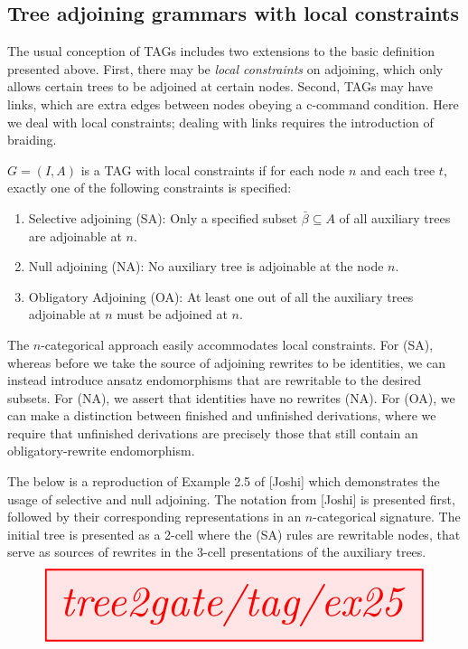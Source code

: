 \subsection{Tree adjoining grammars with local constraints}

The usual conception of TAGs includes two extensions to the basic definition presented above. First, there may be \emph{local constraints} on adjoining, which only allows certain trees to be adjoined at certain nodes. Second, TAGs may have links, which are extra edges between nodes obeying a c-command condition. Here we deal with local constraints; dealing with links requires the introduction of braiding.

\begin{defn}
$G = (I,A)$ is a TAG with local constraints if for each node $n$ and each tree $t$, exactly one of the following constraints is specified:
\begin{enumerate}
\item{Selective adjoining (SA): Only a specified subset $\bar{\beta} \subseteq A$ of all auxiliary trees are adjoinable at $n$.}
\item{Null adjoining (NA): No auxiliary tree is adjoinable at the node $n$.}
\item{Obligatory Adjoining (OA): At least one out of all the auxiliary trees adjoinable at $n$ must be adjoined at $n$.}
\end{enumerate}
\end{defn}

The $n$-categorical approach easily accommodates local constraints. For (SA), whereas before we take the source of adjoining rewrites to be identities, we can instead introduce ansatz endomorphisms that are rewritable to the desired subsets. For (NA), we assert that identities have no rewrites (NA). For (OA), we can make a distinction between finished and unfinished derivations, where we require that unfinished derivations are precisely those that still contain an obligatory-rewrite endomorphism.

\begin{example}
The below is a reproduction of Example 2.5 of [Joshi] which demonstrates the usage of selective and null adjoining. The notation from [Joshi] is presented first, followed by their corresponding representations in an $n$-categorical signature. The initial tree is presented as a 2-cell where the (SA) rules are rewritable nodes, that serve as sources of rewrites in the 3-cell presentations of the auxiliary trees.
\[\resizebox{\textwidth}{!}{\tikzfig{tree2gate/tag/ex25}}\]
\end{example}

